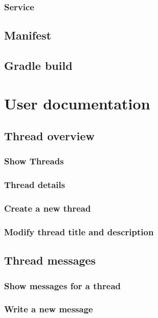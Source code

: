 \documentclass[12pt,a4paper,oneside]{report}
\begin{document}
\subsection{Service}

\section{Manifest}

\section{Gradle build}

\chapter{User documentation}

\section{Thread overview}

\subsection{Show Threads}

\subsection{Thread details}

\subsection{Create a new thread}

\subsection{Modify thread title and description}

\section{Thread messages}

\subsection{Show messages for a thread}

\subsection{Write a new message}
\end{document}
